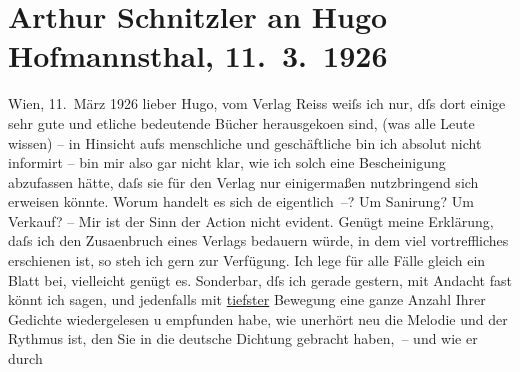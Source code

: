 

               \section[Arthur Schnitzler an Hugo Hofmannsthal, 11. 3. 1926]{ Arthur Schnitzler an Hugo Hofmannsthal, 11. 3. 1926}\nopagebreak{}\rehead{ }\begin{ledgroupsized}[t]{13cm}\normalsize\beginnumbering{} \toendnotes[C]{\smallbreak\pagebreak[2]} 
\pstart
           \raggedleft{}{\pb}Wien, 11. März 1926\pend
           \pstart
           lieber Hugo, vom Verlag Reiss
                    weiſs ich nur, dſs dort einige sehr gute und etliche bedeutende Bücher
                        herausgeko{\geminationm}en sind, (was alle Leute wissen) –
                        \introOben{}in Hinsicht aufs\introOben{} menschliche und geschäftliche bin
                    ich absolut nicht informirt – bin mir also gar nicht klar, wie ich solch eine
                    Bescheinigung abzufassen hätte, daſs sie für den Verlag nur einigermaßen
                    nutzbringend sich erweisen könnte. Worum handelt es sich de{\geminationn} eigentlich –? Um Sanirung? Um Verkauf? – Mir ist
                    der Sinn der Action nicht evident. Genügt meine Erklärung, daſs ich den
                    Zusa{\geminationm}enbruch eines Verlags bedauern würde, in dem viel vortreffliches
                    erschienen ist, so steh ich gern zur Verfügung. Ich lege für alle Fälle gleich
                    ein Blatt bei, vielleicht genügt es.\pend
           \pstart
           {\pb}Sonderbar, dſs ich gerade gestern, mit Andacht
                    fast könnt ich sagen, und jedenfalls mit \uline{tiefster} Bewegung eine ganze Anzahl Ihrer Gedichte \introOben{}wieder\introOben{}gelesen u empfunden habe, wie unerhört neu die Melodie und der
                    Rythmus ist, den Sie in die deutsche Dichtung gebracht haben, – und wie er durch

\end{ledgroupsized}
